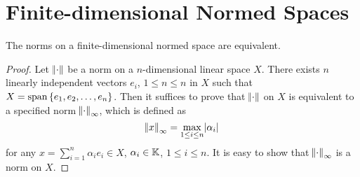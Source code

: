 \section{Finite-dimensional Normed Spaces}
\begin{thm}
The norms on a finite-dimensional normed space are equivalent. 
\end{thm}
\begin{proof}
Let $\norm{\mathord{\cdot}}$ be a norm on a $n$-dimensional linear space $X$. 
There exists $n$ linearly independent vectors $e_i$, $1 \le n \le n$ 
in $X$ such that $X = \operatorname{span} \left\{ e_1, e_2, \ldots, e_n \right\}$. 
Then it suffices to prove that $\norm{\mathord{\cdot}}$ on $X$ is equivalent to 
a specified norm $\norm{\mathord{\cdot}}_\infty$, which is defined as 
\begin{equation*}
    \norm{x}_\infty = \max_{1 \le i \le n} \abs{\alpha_i} 
\end{equation*}
for any $x = \sum_{i=1}^{n} \alpha_i e_i \in X$, $\alpha_i \in \mathbb{K}$, 
$1 \le i \le n$. 
It is easy to show that $\norm{\mathord{\cdot}}_\infty$ is a norm on $X$. 


\end{proof}
